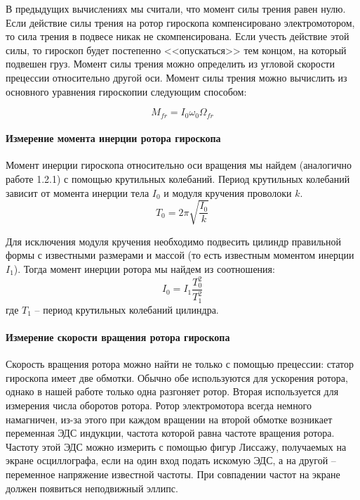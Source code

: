 \documentclass[a4paper,12pt]{article}
\begin{document}
	В предыдущих вычислениях мы считали, что момент силы трения равен нулю. Если действие силы трения на ротор гироскопа компенсировано электромотором, то сила трения в подвесе никак не скомпенсирована. Если учесть действие этой силы, то гироскоп будет постепенно <<опускаться>> тем концом, на который подвешен груз. Момент силы трения можно определить из угловой скорости прецессии относительно другой оси. Момент силы трения можно вычислить из основного уравнения гироскопии следующим способом:
	
	\begin{equation}
		\label{Mfric}
		M_{fr}=I_0\omega_0\Omega_{fr}
	\end{equation}
	
	\paragraph{Измерение момента инерции ротора гироскопа}
	Момент инерции гироскопа относительно оси вращения мы найдем (аналогично работе 1.2.1) с помощью крутильных колебаний. Период крутильных колебаний зависит от момента инерции тела $I_0$ и модуля кручения проволоки $k$.
	\begin{equation}
		\label{T0}
		T_0=2\pi\sqrt{\frac{I_0}{k}}
	\end{equation}
	
	Для исключения модуля кручения необходимо подвесить цилиндр правильной формы с известными размерами и массой (то есть известным моментом инерции $I_1$). Тогда момент инерции ротора мы найдем из соотношения:
	\begin{equation}
		\label{I0}
		I_0=I_1\frac{T_0^2}{T_1^2}
	\end{equation}
	где $T_1$ -- период крутильных колебаний цилиндра.\\
	
	\paragraph{Измерение скорости вращения ротора гироскопа} Скорость вращения ротора можно найти не только с помощью прецессии: статор гироскопа имеет две обмотки. Обычно обе используются для ускорения ротора, однако в нашей работе только одна разгоняет ротор. Вторая используется для измерения числа оборотов ротора. Ротор электромотора всегда немного намагничен, из-за этого при каждом вращении на второй обмотке возникает переменная ЭДС индукции, частота которой равна частоте вращения ротора. Частоту этой ЭДС можно измерить с помощью фигур Лиссажу, получаемых на экране осциллографа, если на один вход подать искомую ЭДС, а на другой -- переменное напряжение известной частоты. При совпадении частот на экране должен появиться неподвижный эллипс.
	
\end{document}
